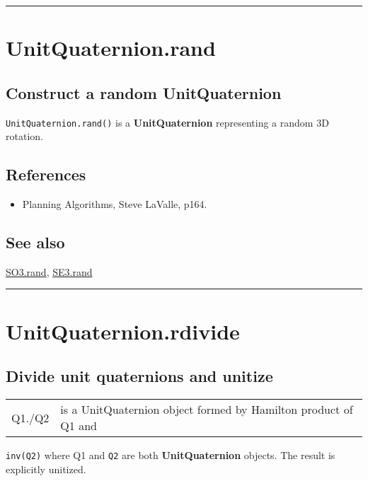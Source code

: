 \vspace{1.5ex}\hrule

\hypertarget{UnitQuaternion.rand}{\section*{UnitQuaternion.rand}}
\subsection*{Construct a random UnitQuaternion}


\texttt{UnitQuaternion.rand()} is a \textbf{\color{red} UnitQuaternion} representing a random 3D rotation.


\subsection*{References}
\begin{itemize}
  \item Planning Algorithms, Steve LaValle, p164.
\end{itemize}

\subsection*{See also}


\hyperlink{SO3.rand}{\color{blue} SO3.rand}, \hyperlink{SE3.rand}{\color{blue} SE3.rand}

\vspace{1.5ex}\hrule

\hypertarget{UnitQuaternion.rdivide}{\section*{UnitQuaternion.rdivide}}
\subsection*{Divide unit quaternions and unitize}
\begin{longtable}{lp{120mm}}
Q1./Q2 & is a UnitQuaternion object formed by Hamilton product of Q1 and\\ 
\end{longtable}\vspace{1ex}


\texttt{inv(Q2)} where Q1 and \texttt{Q2} are both \textbf{\color{red} UnitQuaternion} objects.  The result is
explicitly unitized.


